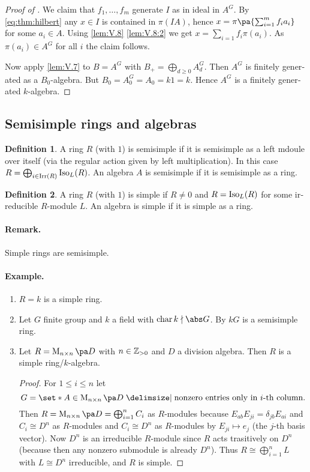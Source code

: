 \documentclass[12pt,a4paper]{scrartcl}
\theoremstyle{cplain}
\theoremstyle{cplain}
\theoremstyle{cplain}
\theoremstyle{definition}
\newtheorem*{deff}{Definition}
\begin{document}
\begin{otherlanguage}{english}
\begin{proof}[Proof of ]
  We claim that $f_1,\ldots,f_m$ generate $I$ as in ideal in $A^G$. By \eqref{eq:thm:hilbert} any $x\in I$ is contained in $\pi(IA)$, hence $x = \pi\pa{\sum_{i=1}^mf_ia_i}$ for some $a_i\in A$. Using \cref{lem:V.8} \ref{lem:V.8:2} we get $x = \sum_{i=1}f_i\pi(a_i)$. As $\pi(a_i)\in A^G$ for all $i$ the claim follows.
  
  Now apply \cref{lem:V.7} to $B = A^G$ with $B_+ = \bigoplus_{d\ge0}A_d^G$. Then $A^G$ is finitely generated as a $B_0$-algebra. But $B_0 = A_0^G =A_0 = k1 = k$. Hence $A^G$ is a finitely generated $k$-algebra.
\end{proof}

\subsection{Semisimple rings and algebras}
\begin{deff}
  A ring $R$ (with $1$) is semisimple if it is semisimple as a left mdoule over itself (via the regular action given by left multiplication). In this case $R=\bigoplus_{i\in \operatorname{Irr}(R)}\operatorname{Iso}_L(R)$. An algebra $A$ is semisimple if it is semisimple as a ring.
\end{deff}

\begin{deff}
  A ring $R$ (with $1$) is simple if $R\neq 0$ and $R=\operatorname{Iso}_L(R)$ for some irreducible $R$-module $L$. An algebra is simple if it is simple as a ring.
\end{deff}


\paragraph{Remark.} Simple rings are semisimple.

\paragraph{Example.}
\begin{enumerate}
  \item $R=k$ is a simple ring.
  \item Let $G$ finite group and $k$ a field with $\chr k\nmid \abs G$. By  $kG$ is a semisimple ring.
  \item Let $R=\Mat nD$ with $n\in\mathbb Z_{>0}$ and $D$ a division algebra. Then $R$ is a simple ring/$k$-algebra.
  \begin{proof}
    For $1\le i\le n$ let \[G = \set*{A\in\Mat nD \given \text{nonzero entries only in $i$-th column}}.\] Then $R=\Mat nD = \bigoplus_{i=1}^nC_i$ as $R$-modules because $E_{ab}E_{ji} = \delta_{jb}E_{ai}$ and $C_i\cong D^n$ as $R$-modules and $C_i\cong D^n$ as $R$-modules by $E_{ji}\mapsto e_j$ (the $j$-th basis vector). Now $D^n$ is an irreducible $R$-module since $R$ acts trasitively on $D^n$ (because then any nonzero submodule is already $D^n$). Thus $R\cong \bigoplus_{i=1}^nL$ with $L\cong D^n$ irreducible, and $R$ is simple.
  \end{proof}
\end{enumerate}


\end{otherlanguage}
\end{document}
